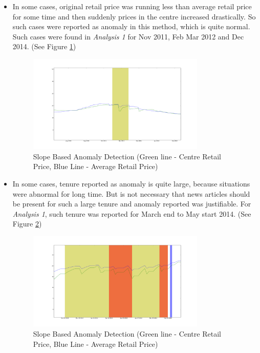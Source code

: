 \begin{itemize}
			\item In some cases, original retail price was running less than average retail price for some time and then suddenly prices in the centre increased drastically. So such cases were reported as anomaly in this method, which is quite normal. Such cases were found in \textit{Analysis 1} for Nov 2011, Feb Mar 2012 and Dec 2014. (See Figure \ref{fig:12114})
			
			\begin{figure}[H]
		    	\centering
  		    	\includegraphics[width=0.8\textwidth]{graphs/12114.png}
		    	\caption{Slope Based Anomaly Detection (Green line - Centre Retail Price, Blue Line - Average Retail Price)}
		    	\label{fig:12114}
			\end{figure}			
			
			\item In some cases, tenure reported as anomaly is quite large, because situations were abnormal for long time. But is not necessary that news articles should be present for such a large tenure and anomaly reported was justifiable. For\textit{ Analysis 1}, such tenure was reported for March end to May start 2014.  (See Figure \ref{fig:12115})
			
			\begin{figure}[H]
		    	\centering
  		    	\includegraphics[width=0.8\textwidth]{graphs/12115.png}
		    	\caption{Slope Based Anomaly Detection (Green line - Centre Retail Price, Blue Line - Average Retail Price)}
		    	\label{fig:12115}
			\end{figure}			
			

\end{itemize}
